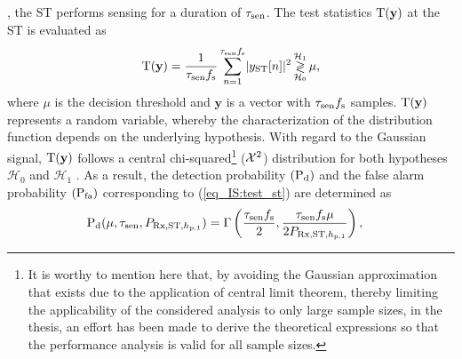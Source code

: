 \subsection{}\label{ssec:pd}
, the ST performs sensing for a duration of $\tau_{\text{sen}}$. The test statistics $\operatorname*{\text{T}(\textbf{y})}$ at the ST is evaluated as   
\begin{align}
\operatorname*{\text{T}(\textbf{y})} = {\frac{1}{{\tau_{\text{sen}} f_{\text{s}}}}\sum_{n=1}^{\tau_{\text{sen}} f_{\text{s}}}} { |y_{\text{ST}}[n]|^2} \mathop{\gtrless}_{\mathcal{H}_0}^{\mathcal{H}_1} \mu, 
\label{eq_IS:test_st}
\end{align}
where $\mu$ is the decision threshold and $\textbf{y}$ is a vector with $\tau_{\text{sen}} f_{\text{s}}$ samples. $\operatorname*{\text{T}(\textbf{y})}$ represents a random variable, whereby the characterization of the distribution function depends on the underlying hypothesis. With regard to the Gaussian signal, $\operatorname*{\text{T}(\textbf{y})}$ follows a central chi-squared\footnote{It is worthy to mention here that, by avoiding the Gaussian approximation that exists due to the application of central limit theorem, thereby limiting the applicability of the considered analysis to only large sample sizes, in the thesis, an effort has been made to derive the theoretical expressions so that the performance analysis is valid for all sample sizes.}  ($\cchi2$) distribution for both hypotheses $\mathcal{H}_0$ and $\mathcal{H}_1$ \cite{Kay}. 
As a result, the detection probability $(\text{P}_{\text{d}})$ and the false alarm probability $(\text{P}_{\text{fa}})$ corresponding to (\ref{eq_IS:test_st}) are determined as \cite{Tan08}
\begin{align}
\text{P}_{\text{d}}(\mu, \tau_{\text{sen}}, P_{\text{Rx,ST,$h_{\text{p,1}}$}}) &= \Gamma\left( \frac{\tau_{\text{sen}} f_{\text{s}}}{2}, \frac{\tau_{\text{sen}} f_{\text{s}} \mu}{2 P_{\text{Rx,ST,$h_{\text{p,1}}$}}} \right),  \label{eq_IS:pd} 
\end{align}
